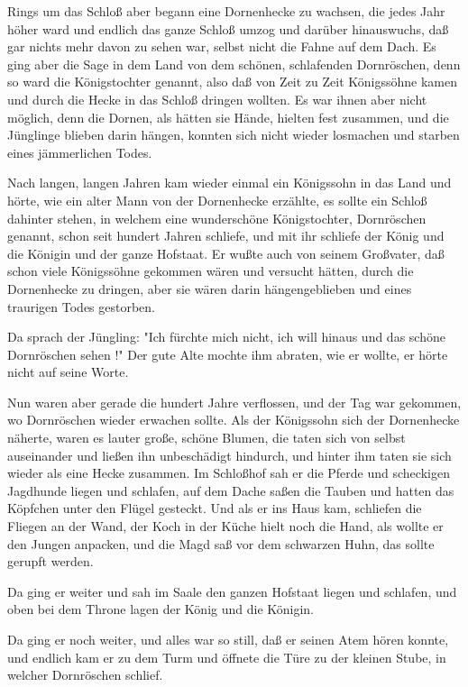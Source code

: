 \documentclass[11pt,a4paper]{CLabBookTemplate} %
\begin{document}
Rings um das Schloß aber begann eine Dornenhecke zu wachsen, die jedes Jahr höher ward und endlich das ganze Schloß umzog und darüber hinauswuchs, daß gar nichts mehr davon zu sehen war, selbst nicht die Fahne auf dem Dach. Es ging aber die Sage in dem Land von dem schönen, schlafenden Dornröschen, denn so ward die Königstochter genannt, also daß von Zeit zu Zeit Königssöhne kamen und durch die Hecke in das Schloß dringen wollten. Es war ihnen aber nicht möglich, denn die Dornen, als hätten sie Hände, hielten fest zusammen, und die Jünglinge blieben darin hängen, konnten sich nicht wieder losmachen und starben eines jämmerlichen Todes.

Nach langen, langen Jahren kam wieder einmal ein Königssohn in das Land und hörte, wie ein alter Mann von der Dornenhecke erzählte, es sollte ein Schloß dahinter stehen, in welchem eine wunderschöne Königstochter, Dornröschen genannt, schon seit hundert Jahren schliefe, und mit ihr schliefe der König und die Königin und der ganze Hofstaat. Er wußte auch von seinem Großvater, daß schon viele Königssöhne gekommen wären und versucht hätten, durch die Dornenhecke zu dringen, aber sie wären darin hängengeblieben und eines traurigen Todes gestorben.

Da sprach der Jüngling: "Ich fürchte mich nicht, ich will hinaus und das schöne Dornröschen sehen !" Der gute Alte mochte ihm abraten, wie er wollte, er hörte nicht auf seine Worte.

Nun waren aber gerade die hundert Jahre verflossen, und der Tag war gekommen, wo Dornröschen wieder erwachen sollte. Als der Königssohn sich der Dornenhecke näherte, waren es lauter große, schöne Blumen, die taten sich von selbst auseinander und ließen ihn unbeschädigt hindurch, und hinter ihm taten sie sich wieder als eine Hecke zusammen. Im Schloßhof sah er die Pferde und scheckigen Jagdhunde liegen und schlafen, auf dem Dache saßen die Tauben und hatten das Köpfchen unter den Flügel gesteckt. Und als er ins Haus kam, schliefen die Fliegen an der Wand, der Koch in der Küche hielt noch die Hand, als wollte er den Jungen anpacken, und die Magd saß vor dem schwarzen Huhn, das sollte gerupft werden.

Da ging er weiter und sah im Saale den ganzen Hofstaat liegen und schlafen, und oben bei dem Throne lagen der König und die Königin.

Da ging er noch weiter, und alles war so still, daß er seinen Atem hören konnte, und endlich kam er zu dem Turm und öffnete die Türe zu der kleinen Stube, in welcher Dornröschen schlief.
\end{document}

